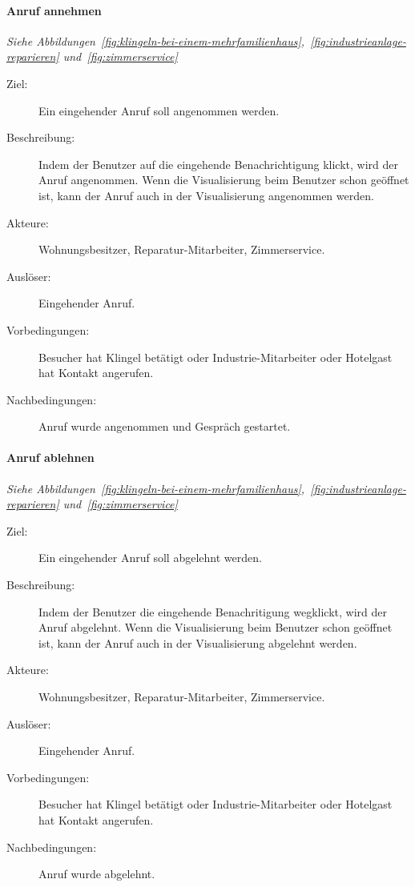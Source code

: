 \paragraph{\large{Anruf annehmen}}
\textit{Siehe Abbildungen~\ref{fig:klingeln-bei-einem-mehrfamilienhaus},~\ref{fig:industrieanlage-reparieren} und~\ref{fig:zimmerservice}}
    \begin{description}
        \item[Ziel:] Ein eingehender Anruf soll angenommen werden.
        \item[Beschreibung:] Indem der Benutzer auf die eingehende Benachrichtigung klickt, wird der Anruf angenommen.
            Wenn die Visualisierung beim Benutzer schon geöffnet ist, kann der Anruf auch in der Visualisierung angenommen werden.
        \item[Akteure:] Wohnungsbesitzer, Reparatur-Mitarbeiter, Zimmerservice.
        \item[Auslöser:] Eingehender Anruf.
        \item[Vorbedingungen:] Besucher hat Klingel betätigt oder Industrie-Mitarbeiter oder Hotelgast hat Kontakt angerufen.
        \item[Nachbedingungen:] Anruf wurde angenommen und Gespräch gestartet.
    \end{description}

\paragraph{\large{Anruf ablehnen}}
\textit{Siehe Abbildungen~\ref{fig:klingeln-bei-einem-mehrfamilienhaus},~\ref{fig:industrieanlage-reparieren} und~\ref{fig:zimmerservice}}
    \begin{description}
        \item[Ziel:] Ein eingehender Anruf soll abgelehnt werden.
        \item[Beschreibung:] Indem der Benutzer die eingehende Benachritigung wegklickt, wird der Anruf abgelehnt.
            Wenn die Visualisierung beim Benutzer schon geöffnet ist, kann der Anruf auch in der Visualisierung abgelehnt werden.
        \item[Akteure:] Wohnungsbesitzer, Reparatur-Mitarbeiter, Zimmerservice.
        \item[Auslöser:] Eingehender Anruf.
        \item[Vorbedingungen:] Besucher hat Klingel betätigt oder Industrie-Mitarbeiter oder Hotelgast hat Kontakt angerufen.
        \item[Nachbedingungen:] Anruf wurde abgelehnt.
    \end{description}

